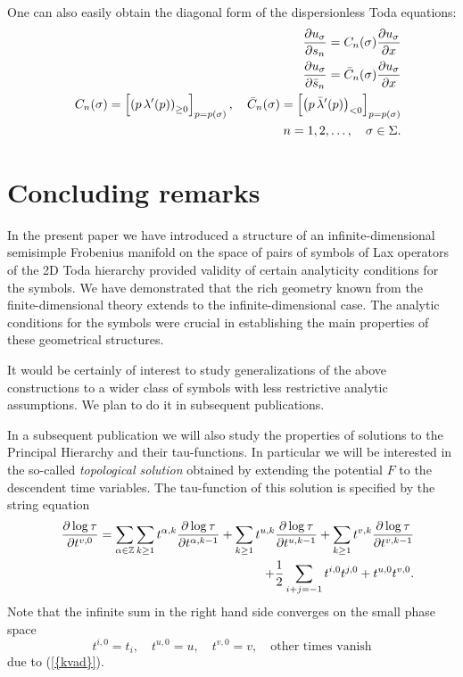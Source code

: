 \documentclass[numbook, envcountsame, envcountreset]{svjour3}
\begin{document}
\begin{remark} One can also easily obtain the diagonal form of the dispersionless Toda equations:
\begin{eqnarray}\label{r-toda}
&&
\frac{{\partial} u_\sigma}{{\partial} s_n} = C_n(\sigma) \frac{{\partial} u_\sigma}{{\partial} x}
{\nonumber}\\
&&
\frac{{\partial} u_\sigma}{{\partial} \bar s_n} = \bar C_n(\sigma) \frac{{\partial} u_\sigma}{{\partial} x}
{\nonumber}\\
&&
C_n(\sigma) =\left[ \left(p \, \lambda'(p)\right)_{\geq 0}\right]_{p=p(\sigma)}, \quad \bar C_n(\sigma) =\left[ \left(p \, \bar\lambda'(p)\right)_{< 0}\right]_{p=p(\sigma)}
\\
&&
n=1, 2, \dots, \quad \sigma\in\Sigma.
{\nonumber}
\end{eqnarray}
\end{remark}

\setcounter{equation}{0}
\setcounter{theorem}{0}
\section{Concluding remarks}\par

In the present paper we have introduced a structure of an infinite-dimensional semisimple Frobenius manifold on the space of pairs of symbols of Lax operators of the 2D Toda hierarchy provided validity of certain analyticity conditions for the symbols. We have demonstrated that the rich geometry known from the finite-dimensional theory extends to the infinite-dimensional case. The analytic conditions for the symbols were crucial in establishing the main properties of these geometrical structures.

It would be certainly of interest to study generalizations of the above constructions to a wider class of symbols with less restrictive analytic assumptions. We plan to do it in subsequent publications.

In a subsequent publication we will also study the properties  of solutions to the Principal Hierarchy and their tau-functions. In particular we will be interested in the so-called {\it topological solution} obtained by extending the potential $F$ to the descendent time variables. The tau-function of this solution is specified by the string equation  
\begin{eqnarray}\label{string}
&&
\frac{{\partial} \log\tau}{{\partial} t^{v,0}}=\sum_{\alpha\in\mathbb Z} \sum_{k\geq 1} t^{\alpha,k}\frac{{\partial} \log\tau}{{\partial} t^{\alpha, k-1}} + \sum_{k\geq 1} t^{u,k}\frac{{\partial} \log\tau}{{\partial} t^{u, k-1}}+ \sum_{k\geq 1} t^{v,k}\frac{{\partial} \log\tau}{{\partial} t^{v, k-1}}
\\
&& 
\qquad\qquad + \frac12 \sum_{i+j=-1} t^{i,0}t^{j,0}+t^{u,0} t^{v,0}.
{\nonumber}
\end{eqnarray}
Note that the infinite sum in the right hand side converges on the small phase space
$$
t^{i,0} = t_i, \quad t^{u,0}=u, \quad t^{v,0}=v, \quad \mbox{other times vanish}
$$
due to {(\ref{{kvad}})}.
\end{document}
